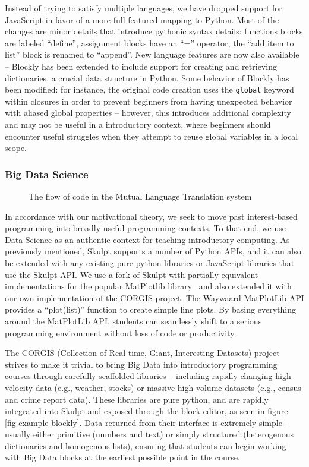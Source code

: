 Instead of trying to satisfy multiple languages, we have dropped support for JavaScript in favor of a more full-featured mapping to Python.
Most of the changes are minor details that introduce pythonic syntax details: functions blocks are labeled ``define'', assignment blocks have an ``='' operator, the ``add item to list'' block is renamed to ``append''.
New language features are now also available -- Blockly has been extended to include support for creating and retrieving dictionaries, a crucial data structure in Python.
Some behavior of Blockly has been modified: for instance, the original code creation uses the \texttt{global} keyword within closures in order to prevent beginners from having unexpected behavior with aliased global properties -- however, this introduces additional complexity and may not be useful in a introductory context, where beginners should encounter useful struggles when they attempt to reuse global variables in a local scope.

\subsubsection{Big Data Science}

\begin{wrapfigure}{R}{0.5\textwidth}
\label{fig-mlt-overview}
\caption{The flow of code in the Mutual Language Translation system}
\end{wrapfigure}

In accordance with our motivational theory, we seek to move past interest-based programming into broadly useful programming contexts.
To that end, we use Data Science as an authentic context for teaching introductory computing.
As previously mentioned, Skulpt supports a number of Python APIs, and it can also be extended with any existing pure-python libraries or JavaScript libraries that use the Skulpt API.
We use a fork of Skulpt with partially equivalent implementations for the popular MatPlotlib library~\cite{SkulptMatPlotLib} and also extended it with our own implementation of the CORGIS project.
The Waywaard MatPlotLib API provides a ``plot(list)'' function to create simple line plots.
By basing everything around the MatPlotLib API, students can seamlessly shift to a serious programming environment without loss of code or productivity. 

The CORGIS (Collection of Real-time, Giant, Interesting Datasets) project strives to make it trivial to bring Big Data into introductory programming courses through carefully scaffolded libraries -- including rapidly changing high velocity data (e.g., weather, stocks) or massive high volume datasets (e.g., census and crime report data).
These libraries are pure python, and are rapidly integrated into Skulpt and exposed through the block editor, as seen in figure \ref{fig-example-blockly}.
Data returned from their interface is extremely simple -- usually either primitive (numbers and text) or simply structured (heterogenous dictionaries and homogenous lists), ensuring that students can begin working with Big Data blocks at the earliest possible point in the course.

